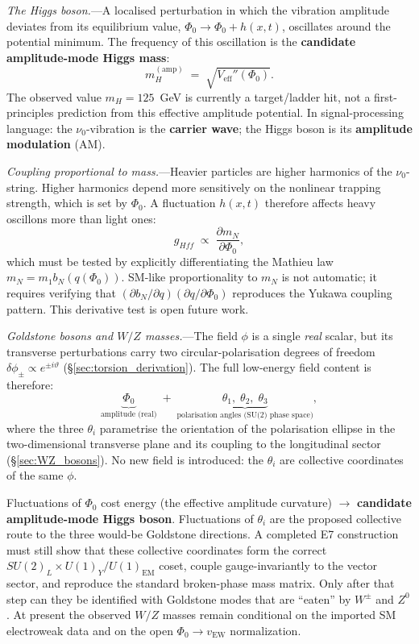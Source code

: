 \documentclass[11pt]{article}
\begin{document}
\textit{The Higgs boson.}---A localised
perturbation in which the vibration amplitude
deviates from its equilibrium value,
$\Phi_0 \to \Phi_0 + h(x,t)$,
oscillates around the potential minimum.
The frequency of this oscillation is the
\textbf{candidate amplitude-mode Higgs mass}:
\begin{equation}\label{eq:higgs_mass}
  m_H^{(\mathrm{amp})}
  \;=\; \sqrt{V_{\mathrm{eff}}''(\Phi_0)}.
\end{equation}
The observed value $m_H=125$~GeV is currently a
target/ladder hit, not a first-principles prediction
from this effective amplitude potential.
In signal-processing language: the
$\nu_0$-vibration is the \textbf{carrier wave};
the Higgs boson is its
\textbf{amplitude modulation} (AM).

\textit{Coupling proportional to mass.}---Heavier
particles are higher harmonics of the
$\nu_0$-string.  Higher harmonics depend more
sensitively on the nonlinear trapping strength,
which is set by $\Phi_0$.  A fluctuation
$h(x,t)$ therefore affects heavy oscillons more
than light ones:
\begin{equation}
  g_{Hff} \;\propto\; \frac{\partial m_N}
  {\partial \Phi_0},
\end{equation}
which must be tested by explicitly differentiating the
Mathieu law $m_N=m_1 b_N(q(\Phi_0))$.  SM-like
proportionality to $m_N$ is not automatic; it requires
verifying that
$(\partial b_N/\partial q)(\partial q/\partial\Phi_0)$
reproduces the Yukawa coupling pattern.  This derivative
test is open future work.

\textit{Goldstone bosons and $W/Z$ masses.}---The
field $\phi$ is a single \emph{real} scalar,
but its transverse perturbations carry two
circular-polarisation degrees of freedom
$\delta\phi_\pm \propto e^{\pm i\vartheta}$
(\S\ref{sec:torsion_derivation}).  The full
low-energy field content is therefore:
\begin{equation}\label{eq:higgs_dof}
  \underbrace{\Phi_0}_{\text{amplitude (real)}}
  \;+\;
  \underbrace{\theta_1,\;\theta_2,\;
  \theta_3}_{\text{polarisation angles
  (SU(2) phase space)}},
\end{equation}
where the three $\theta_i$ parametrise the
orientation of the polarisation ellipse in
the two-dimensional transverse plane and its
coupling to the longitudinal sector
(\S\ref{sec:WZ_bosons}).  No new field is
introduced: the $\theta_i$ are collective
coordinates of the same $\phi$.

Fluctuations of $\Phi_0$ cost energy
(the effective amplitude curvature)
$\to$ \textbf{candidate amplitude-mode Higgs boson}.
Fluctuations of $\theta_i$ are the proposed collective
route to the three would-be Goldstone directions.  A
completed E7 construction must still show that these
collective coordinates form the correct
$SU(2)_L\times U(1)_Y/U(1)_{\mathrm{EM}}$ coset, couple
gauge-invariantly to the vector sector, and reproduce the
standard broken-phase mass matrix.  Only after that step
can they be identified with Goldstone modes that are
``eaten'' by $W^\pm$ and $Z^0$.  At present the observed
$W/Z$ masses remain conditional on the imported SM
electroweak data and on the open
$\Phi_0\to v_{\mathrm{EW}}$ normalization.
\end{document}
